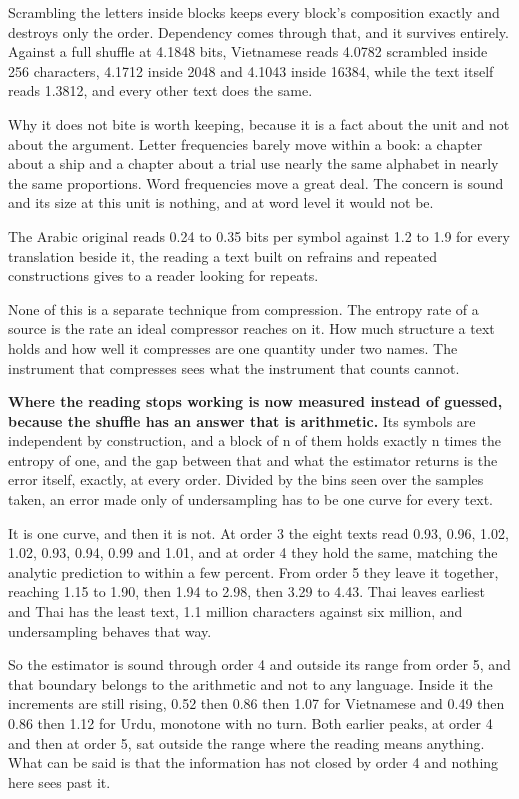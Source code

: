 Scrambling the letters inside blocks keeps every block's composition exactly and destroys only the order. Dependency comes through that, and it survives entirely. Against a full shuffle at 4.1848 bits, Vietnamese reads 4.0782 scrambled inside 256 characters, 4.1712 inside 2048 and 4.1043 inside 16384, while the text itself reads 1.3812, and every other text does the same.

Why it does not bite is worth keeping, because it is a fact about the unit and not about the argument. Letter frequencies barely move within a book: a chapter about a ship and a chapter about a trial use nearly the same alphabet in nearly the same proportions. Word frequencies move a great deal. The concern is sound and its size at this unit is nothing, and at word level it would not be.

The Arabic original reads 0.24 to 0.35 bits per symbol against 1.2 to 1.9 for every translation beside it, the reading a text built on refrains and repeated constructions gives to a reader looking for repeats.

None of this is a separate technique from compression. The entropy rate of a source is the rate an ideal compressor reaches on it. How much structure a text holds and how well it compresses are one quantity under two names. The instrument that compresses sees what the instrument that counts cannot.

\textbf{Where the reading stops working is now measured instead of guessed, because the shuffle has an answer that is arithmetic.} Its symbols are independent by construction, and a block of n of them holds exactly n times the entropy of one, and the gap between that and what the estimator returns is the error itself, exactly, at every order. Divided by the bins seen over the samples taken, an error made only of undersampling has to be one curve for every text.

It is one curve, and then it is not. At order 3 the eight texts read 0.93, 0.96, 1.02, 1.02, 0.93, 0.94, 0.99 and 1.01, and at order 4 they hold the same, matching the analytic prediction to within a few percent. From order 5 they leave it together, reaching 1.15 to 1.90, then 1.94 to 2.98, then 3.29 to 4.43. Thai leaves earliest and Thai has the least text, 1.1 million characters against six million, and undersampling behaves that way.

So the estimator is sound through order 4 and outside its range from order 5, and that boundary belongs to the arithmetic and not to any language. Inside it the increments are still rising, 0.52 then 0.86 then 1.07 for Vietnamese and 0.49 then 0.86 then 1.12 for Urdu, monotone with no turn. Both earlier peaks, at order 4 and then at order 5, sat outside the range where the reading means anything. What can be said is that the information has not closed by order 4 and nothing here sees past it.

